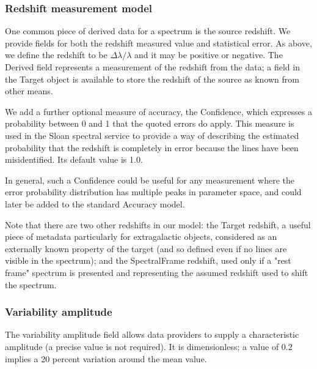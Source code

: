 \documentclass[11pt]{article}
\begin{document}
\subsubsection{Redshift measurement model}  

One common piece of derived data for a spectrum is the source redshift.
We provide fields for both the redshift measured value and statistical error.
As above, we define the redshift to be $\Delta\lambda/\lambda$ and it
may be positive or negative. The Derived field represents a measurement
of the redshift from the data; a field in the Target object is available
to store the redshift of the source as known from other means. 

We add a further optional measure of accuracy, the Confidence, which expresses
a probability between 0 and 1 that the quoted errors do apply. This measure
is used in the Sloan spectral service to provide a way of describing the
estimated probability that the redshift is completely in error because
the lines have been misidentified. Its default value is 1.0.

In general, such a Confidence could be useful for any measurement where
the error probability distribution has multiple peaks in parameter
space, and could later be added to the standard Accuracy model.

Note that there are two other redshifts in our model: the Target redshift,
a useful piece of metadata particularly for extragalactic objects,
considered as an externally known property of the target (and so defined
even if no lines are visible in the spectrum); and the SpectralFrame
redshift, used only if a "rest frame" spectrum is presented and
representing the assumed redshift used to shift the spectrum.

\subsubsection{Variability amplitude}

The variability amplitude field allows data providers to supply
a characteristic amplitude (a precise value is not required).
It is dimensionless; a value of 0.2 implies a 20 percent variation
around the mean value.
\end{document}
